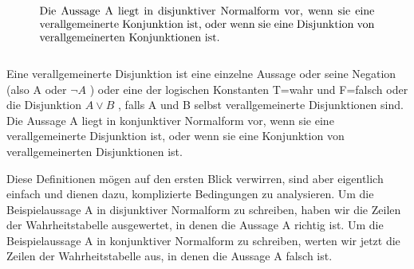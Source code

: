 \begin{equation}
    \parbox{30em}{Die Aussage A liegt in disjunktiver Normalform vor, wenn sie eine verallgemeinerte Konjunktion ist, oder wenn sie eine 
    Disjunktion von verallgemeinerten Konjunktionen ist. }
\end{equation}
\\
Eine verallgemeinerte Disjunktion ist eine einzelne Aussage oder seine Negation (also A oder \(\lnot A\) ) oder eine der logischen Konstanten T=wahr und F=falsch oder die Disjunktion \(A \lor B \) , falls A und B selbst verallgemeinerte Disjunktionen 
sind.
Die Aussage A liegt in konjunktiver Normalform vor, wenn sie eine verallgemeinerte Disjunktion ist, oder wenn sie eine
Konjunktion von verallgemeinerten Disjunktionen ist.

Diese Definitionen mögen auf den ersten Blick verwirren, sind aber eigentlich einfach und
dienen dazu, komplizierte Bedingungen zu analysieren. Um die Beispielaussage A in disjunktiver Normalform zu schreiben,
haben wir die Zeilen der Wahrheitstabelle ausgewertet, in denen die Aussage A richtig ist.
Um die Beispielaussage A in konjunktiver Normalform zu schreiben, werten wir jetzt die Zeilen der Wahrheitstabelle aus, in denen die
Aussage A falsch ist.

